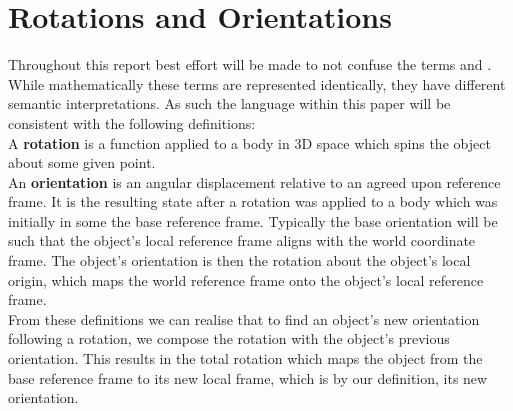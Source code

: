 \section{Rotations and Orientations}
\label{sec:rotations}
Throughout this report best effort will be made to not confuse the terms  and . While mathematically these terms are represented identically, they have different semantic interpretations. As such the language within this paper will be consistent with the following definitions:\\
A \textbf{rotation} is a function applied to a body in 3D space which spins the object about some given point.\\ %
An \textbf{orientation} is an angular displacement relative to an agreed upon reference frame. It is the resulting state after a rotation was applied to a body which was initially in some the base reference frame. Typically the base orientation will be such that the object's local reference frame aligns with the world coordinate frame. The object's orientation is then the rotation about the object's local origin, which maps the world reference frame onto the object's local reference frame.\\

From these definitions we can realise that to find an object's new orientation following a rotation, we compose the rotation with the object's previous orientation. This results in the total rotation which maps the object from the base reference frame to its new local frame, which is by our definition, its new orientation.

